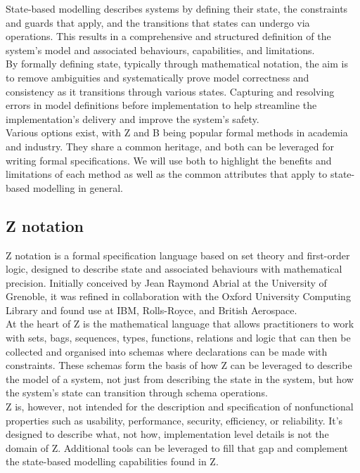 \documentclass{article}
\begin{document}
State-based modelling describes systems by defining their state, the constraints and guards that apply, and the transitions that states can undergo via operations. This results in a comprehensive and structured definition of the system’s model and associated behaviours, capabilities, and limitations. \\
\newline
By formally defining state, typically through mathematical notation, the aim is to remove ambiguities and systematically prove model correctness and consistency as it transitions through various states. Capturing and resolving errors in model definitions before implementation to help streamline the implementation's delivery and improve the system's safety. \\
\newline
Various options exist, with Z and B being popular formal methods in academia and industry. They share a common heritage, and both can be leveraged for writing formal specifications. We will use both to highlight the benefits and limitations of each method as well as the common attributes that apply to state-based modelling in general.

\subsection*{Z notation}
Z notation is a formal specification language based on set theory and first-order logic, designed to describe state and associated behaviours with mathematical precision. Initially conceived by Jean Raymond Abrial at the University of Grenoble, it was refined in collaboration with the Oxford University Computing Library and found use at IBM, Rolls-Royce, and British Aerospace. \\
\newline
At the heart of Z is the mathematical language that allows practitioners to work with sets, bags, sequences, types, functions, relations and logic that can then be collected and organised into schemas where declarations can be made with constraints. These schemas form the basis of how Z can be leveraged to describe the model of a system, not just from describing the state in the system, but how the system’s state can transition through schema operations. \\
\newline
Z is, however, not intended for the description and specification of nonfunctional properties such as usability, performance, security, efficiency, or reliability. It's designed to describe what, not how, implementation level details is not the domain of Z. Additional tools can be leveraged to fill that gap and complement the state-based modelling capabilities found in Z. 
\end{document}
